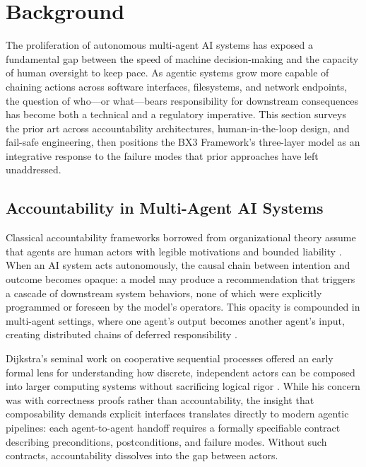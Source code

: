 \section{Background}

The proliferation of autonomous multi-agent AI systems has exposed a fundamental gap between the speed of machine decision-making and the capacity of human oversight to keep pace. As agentic systems grow more capable of chaining actions across software interfaces, filesystems, and network endpoints, the question of who—or what—bears responsibility for downstream consequences has become both a technical and a regulatory imperative. This section surveys the prior art across accountability architectures, human-in-the-loop design, and fail-safe engineering, then positions the BX3 Framework's three-layer model as an integrative response to the failure modes that prior approaches have left unaddressed.

\subsection{Accountability in Multi-Agent AI Systems}

Classical accountability frameworks borrowed from organizational theory assume that agents are human actors with legible motivations and bounded liability \cite{wiener1948}. When an AI system acts autonomously, the causal chain between intention and outcome becomes opaque: a model may produce a recommendation that triggers a cascade of downstream system behaviors, none of which were explicitly programmed or foreseen by the model's operators. This opacity is compounded in multi-agent settings, where one agent's output becomes another agent's input, creating distributed chains of deferred responsibility \cite{bansal2019}.

Dijkstra's seminal work on cooperative sequential processes offered an early formal lens for understanding how discrete, independent actors can be composed into larger computing systems without sacrificing logical rigor \cite{dijkstra1982}. While his concern was with correctness proofs rather than accountability, the insight that composability demands explicit interfaces translates directly to modern agentic pipelines: each agent-to-agent handoff requires a formally specifiable contract describing preconditions, postconditions, and failure modes. Without such contracts, accountability dissolves into the gap between actors.

